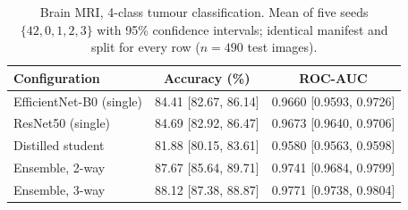 \begin{table}[t]
\centering
\caption{Brain MRI, 4-class tumour classification. Mean of five seeds $\{42,0,1,2,3\}$ with 95\% confidence intervals; identical manifest and split for every row ($n=490$ test images).}
\label{tab:brain_mri}
\begin{tabular}{lcc}
\toprule
Configuration & Accuracy (\%) & ROC-AUC \\
\midrule
EfficientNet-B0 (single) & 84.41 \tiny{[82.67, 86.14]} & 0.9660 \tiny{[0.9593, 0.9726]} \\
ResNet50 (single) & 84.69 \tiny{[82.92, 86.47]} & 0.9673 \tiny{[0.9640, 0.9706]} \\
Distilled student & 81.88 \tiny{[80.15, 83.61]} & 0.9580 \tiny{[0.9563, 0.9598]} \\
Ensemble, 2-way & 87.67 \tiny{[85.64, 89.71]} & 0.9741 \tiny{[0.9684, 0.9799]} \\
Ensemble, 3-way & 88.12 \tiny{[87.38, 88.87]} & 0.9771 \tiny{[0.9738, 0.9804]} \\
\bottomrule
\end{tabular}
\end{table}
